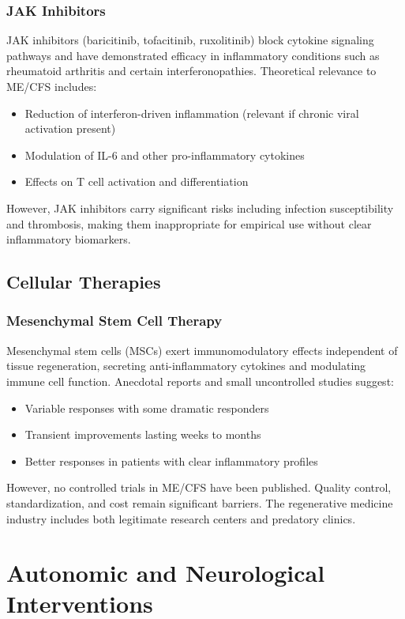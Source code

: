 \subsubsection{JAK Inhibitors}

JAK inhibitors (baricitinib, tofacitinib, ruxolitinib) block cytokine signaling pathways and have demonstrated efficacy in inflammatory conditions such as rheumatoid arthritis and certain interferonopathies. Theoretical relevance to ME/CFS includes:
\begin{itemize}
    \item Reduction of interferon-driven inflammation (relevant if chronic viral activation present)
    \item Modulation of IL-6 and other pro-inflammatory cytokines
    \item Effects on T cell activation and differentiation
\end{itemize}
However, JAK inhibitors carry significant risks including infection susceptibility and thrombosis, making them inappropriate for empirical use without clear inflammatory biomarkers.

\subsection{Cellular Therapies}

\subsubsection{Mesenchymal Stem Cell Therapy}

Mesenchymal stem cells (MSCs) exert immunomodulatory effects independent of tissue regeneration, secreting anti-inflammatory cytokines and modulating immune cell function. Anecdotal reports and small uncontrolled studies suggest:
\begin{itemize}
    \item Variable responses with some dramatic responders
    \item Transient improvements lasting weeks to months
    \item Better responses in patients with clear inflammatory profiles
\end{itemize}
However, no controlled trials in ME/CFS have been published. Quality control, standardization, and cost remain significant barriers. The regenerative medicine industry includes both legitimate research centers and predatory clinics.

\section{Autonomic and Neurological Interventions}
\label{sec:neurological-interventions}

